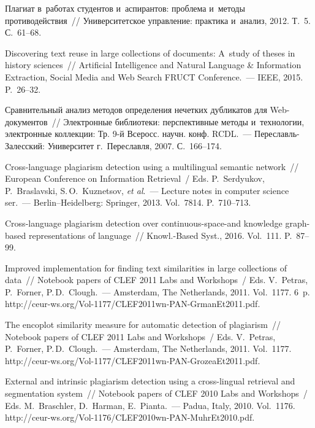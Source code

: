 \begin{multicols}{2}
{{\begin{thebibliography}{99}
 Плагиат в~работах 
студентов и~аспирантов: проблема и~методы противодействия~// Университетское 
управление: практика и~анализ, 2012. Т.~5. С.~61--68.

 Discovering text reuse in large collections of documents: A~study 
of theses in history sciences~//  Artificial Intelligence and Natural Language 
\& Information Extraction, Social Media and Web Search FRUCT Conference.~--- 
IEEE, 2015. P.~26--32.


 Сравнительный анализ методов 
определения нечетких дубликатов для Web-до\-ку\-мен\-тов~// Электронные библиотеки: 
перспективные методы и~технологии, электронные коллекции: Тр. 9-й 
Всеросс. научн. конф. RCDL.~--- Пе\-ре\-славль-За\-лес\-ский: 
Университет г.~Переславля, 2007. С.~166--174.



 Cross-language plagiarism 
detection using a multilingual semantic network~//  European Conference on 
Information Retrieval~/
Eds. P.~Serdyukov, P.~Braslavski, S.\,O.~Kuznetsov, \textit{et al}.~---
Lecture notes in computer science ser.~--- Berlin--Heidelberg: Springer,  2013. Vol.~7814. P.~710--713.

 Cross-language 
plagiarism detection over continuous-space-and knowledge graph-based 
representations of language~// Knowl.-Based Syst., 2016. Vol.~111. P.~87--99.


 Improved implementation for finding text 
similarities in large collections of data~// Notebook papers of CLEF 2011 Labs and Workshops~/ 
Eds. V.~Petras, P.~Forner, P.\,D.~Clough.~--- Amsterdam, The Netherlands, 
2011. Vol.~1177. 6~p. {\sf http://ceur-ws.org/Vol-1177/CLEF2011wn-PAN-GrmanEt2011.pdf}.

 The encoplot similarity measure for automatic 
detection of plagiarism~// Notebook papers of CLEF 2011 Labs and Workshops~/ Eds. V.~Petras, P.~Forner, P.\,D.~Clough.~--- Amsterdam, The Netherlands, 
2011. Vol.~1177. {\sf http://ceur-ws.org/Vol-1177/CLEF2011wn-PAN-GrozeaEt2011.pdf}. 

 External and intrinsic 
plagiarism detection using a cross-lingual retrieval and segmentation system~// 
Notebook papers of CLEF 2010 Labs and Workshops~/
Eds. M.~Braschler, D.~Harman, E.~Pianta.~---
Padua, Italy, 2010. Vol.~1176.
{\sf http://ceur-ws.org/Vol-1176/CLEF2010wn-PAN-MuhrEt2010.pdf}.


\end{thebibliography}}}
\end{multicols}
